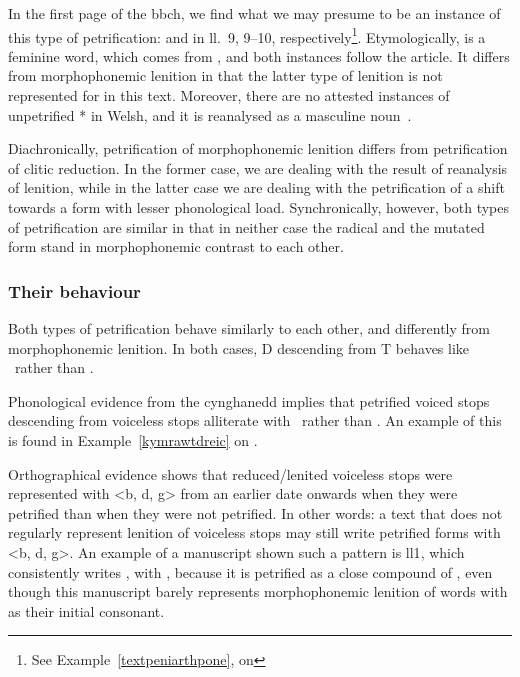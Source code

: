 In the first page of the \gls{bbch}, we find what we may presume to be an instance of this type of petrification:  and  in ll.~9, 9--10, respectively\footnote{See Example~\ref{textpeniarthpone}, on }. 
Etymologically,  is a feminine word, which comes from , and both instances follow the article. 
It differs from morphophonemic lenition in that the latter type of lenition is not represented for  in this text. 
Moreover, there are no attested instances of unpetrified * in Welsh, and it is reanalysed as a masculine noun~\autocite[Grawys, Garawys]{bevan_geiriadur_2014}. 


Diachronically, petrification of morphophonemic lenition differs from petrification of clitic reduction. 
In the former case, we are dealing with the result of reanalysis of lenition, while in the latter case we are dealing with the petrification of a shift towards a form with lesser phonological load. 
Synchronically, however, both types of petrification are similar in that in neither case the radical and the mutated form stand in morphophonemic contrast to each other. 

\subsubsection{Their behaviour}
Both types of petrification behave similarly to each other, and differently from morphophonemic lenition. 
In both cases, \gls{D} descending from \gls{T} behaves like \xD\ rather than \lT.

Phonological evidence from the cynghanedd implies that petrified voiced stops descending from voiceless stops alliterate with \xD\ rather than \lT. An example of this is found in Example~\ref{kymrawtdreic} on . 

Orthographical evidence shows that reduced/lenited voiceless stops were represented with <b, d, g> from an earlier date onwards when they were petrified than when they were not petrified. 
In other words: a text that does not regularly represent lenition of voiceless stops may still write petrified forms with <b, d, g>. 
An example of a manuscript shown such a pattern is \gls{ll1}, which consistently writes , with , because it is petrified as a close compound of , even though this manuscript barely represents morphophonemic lenition of words with  as their initial consonant.

